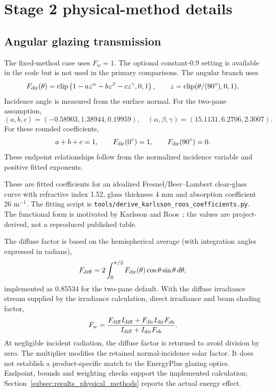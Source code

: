 \section{Stage 2 physical-method details}
\label{app:stage2}
\subsection{Angular glazing transmission}
\label{app:angular}
The fixed-method case uses $F_w=1$. The optional constant-0.9 setting is available in the code but is not used in the primary comparisons. The angular branch uses
\begin{equation}
F_{\rm dir}(\theta)=\operatorname{clip}
\left(1-az^{\alpha}-bz^{\beta}-cz^{\gamma},0,1\right),
\qquad z=\operatorname{clip}(\theta/(90^{\circ}),0,1).
\end{equation}
Incidence angle is measured from the surface normal. For the two-pane assumption,
\[
(a,b,c)=(-0.58903,1.38944,0.19959),\quad
(\alpha,\beta,\gamma)=(15.1131,6.2706,2.3007).
\]
For these rounded coefficients,
\begin{equation}
a+b+c=1,\qquad F_{\rm dir}(0^{\circ})=1,\qquad
F_{\rm dir}(90^{\circ})=0.
\end{equation}
These endpoint relationships follow from the normalized incidence variable and positive fitted exponents.

These are fitted coefficients for an idealized Fresnel/Beer--Lambert clear-glass curve with refractive index 1.52, glass thickness 4 mm and absorption coefficient 26 m$^{-1}$. The fitting script is \nolinkurl{tools/derive_karlsson_roos_coefficients.py}. The functional form is motivated by Karlsson and Roos~\cite{karlsson2000}; the values are project-derived, not a reproduced published table.

The diffuse factor is based on the hemispherical average (with integration angles expressed in radians),
\begin{equation}
F_{\rm diff}=2\int_0^{\pi/2}F_{\rm dir}(\theta)\cos\theta\sin\theta\,d\theta,
\end{equation}
implemented as 0.85534 for the two-pane default. With the diffuse irradiance stream supplied by the irradiance calculation, direct irradiance and beam shading factor,
\begin{equation}
F_w=\frac{F_{\rm diff}I_{\rm diff}+F_{\rm dir}I_{\rm dir}F_{\rm sh}}
{I_{\rm diff}+I_{\rm dir}F_{\rm sh}}.
\end{equation}
At negligible incident radiation, the diffuse factor is returned to avoid division by zero. The multiplier modifies the retained normal-incidence solar factor. It does not establish a product-specific match to the EnergyPlus glazing optics. Endpoint, bounds and weighting checks support the implemented calculation; Section~\ref{subsec:results_physical_methods} reports the actual energy effect.

